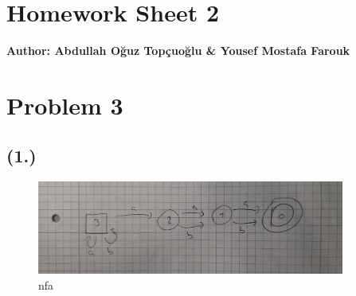 \documentclass{article}
\begin{document}
\section*{\huge Homework Sheet 2}
\begin{flushright}
   \textbf{Author: Abdullah Oğuz Topçuoğlu \& Yousef Mostafa Farouk}
\end{flushright}


\section*{Problem 3}

\subsection*{(1.)}

\begin{figure}[h!]
  \centering
  \includegraphics[width=0.9\textwidth]{3_nfa.jpeg}
  \caption{nfa}
\end{figure}
\end{document}
